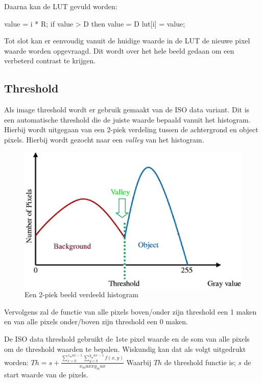 Daarna kan de LUT gevuld worden:

\begin{cppcode}
value = i * R;
if value > D then value = D
lut[i] = value;
\end{cppcode}

Tot slot kan er eenvoudig vanuit de huidige waarde in de LUT de nieuwe pixel waarde
worden opgevraagd. Dit wordt over het hele beeld gedaan om een verbeterd contrast te
krijgen.

\subsection{Threshold}
\label{sub:threshold}
Als image threshold wordt er gebruik gemaakt van de ISO data variant. Dit is een
automatische threshold die de juiste waarde bepaald vanuit het histogram. Hierbij
wordt uitgegaan van een 2-piek verdeling tussen de achtergrond en object pixels.
Hierbij wordt gezocht naar een \emph{valley} van het histogram.

\begin{figure}
    \begin{center}
        \includegraphics[scale=0.35]{figures/histogram.png}
    \end{center}
    \caption{Een 2-piek beeld verdeeld histogram}
    \label{fig:histogram}
\end{figure}

Vervolgens zal de functie van alle pixels boven/onder zijn threshold een 1 maken
en van alle pixels onder/boven zijn threshold een 0 maken.

De ISO data threshold gebruikt de 1ste pixel waarde en de som van alle pixels om
de threshold waarden te bepalen.
Wiskundig kan dat als volgt uitgedrukt worden:
$Th = s + \frac{\sum\limits_{x=0}^{x_max-1} \sum\limits_{y=0}^{y_max-1} f(x, y)}{x_max x y_max}  $
Waarbij $Th$ de threshold functie is;
$s$ de start waarde van de pixels.

